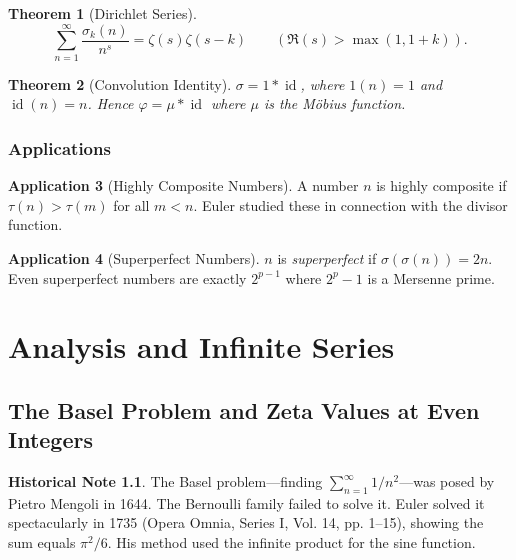 \documentclass[11pt,a4paper,twoside]{book}
\theoremstyle{eulerstyle}
\newtheorem{theorem}{Theorem}[chapter]
\theoremstyle{definition}
\newtheorem{historical}[theorem]{Historical Note}
\newtheorem{application}[theorem]{Application}
\DeclareMathOperator{\id}{id}
\begin{document}
\begin{theorem}[Dirichlet Series]
\[
\sum_{n=1}^\infty \frac{\sigma_k(n)}{n^s} = \zeta(s) \zeta(s-k) \qquad (\Re(s) > \max(1, 1+k)).
\]
\end{theorem}

\begin{theorem}[Convolution Identity]
$\sigma = 1 * \id$, where $1(n)=1$ and $\id(n)=n$. Hence $\varphi = \mu * \id$ where $\mu$ is the Möbius function.
\end{theorem}

\section{Applications}

\begin{application}[Highly Composite Numbers]
A number $n$ is highly composite if $\tau(n) > \tau(m)$ for all $m < n$. Euler studied these in connection with the divisor function.
\end{application}

\begin{application}[Superperfect Numbers]
$n$ is \emph{superperfect} if $\sigma(\sigma(n)) = 2n$. Even superperfect numbers are exactly $2^{p-1}$ where $2^p - 1$ is a Mersenne prime.
\end{application}

\cleardoublepage

\part{Analysis and Infinite Series}
\label{part:analysis}

\chapter{The Basel Problem and Zeta Values at Even Integers}
\label{ch:basel}

\begin{historical}
The Basel problem---finding $\sum_{n=1}^\infty 1/n^2$---was posed by Pietro Mengoli in 1644. The Bernoulli family failed to solve it. Euler solved it spectacularly in 1735 (Opera Omnia, Series I, Vol. 14, pp. 1--15), showing the sum equals $\pi^2/6$. His method used the infinite product for the sine function.
\end{historical}
\end{document}
